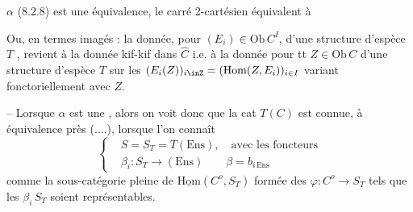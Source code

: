  $\alpha$ (8.2.8) est  une équivalence,  le carré 2-cartésien
 équivalent à

\margin{$\underset{\rightarrow}{\lambda}=\varnothing$}
Ou, en termes imagés : la donnée, pour $(E_i)\in\mathrm{Ob}\,C^I$, d'une
structure d'espèce $T$ , revient à la donnée 
kif-kif dans $\widehat C$ i.e. à la donnée pour tt $Z\in\mathrm{Ob}\,C$ d'une
structure d'espèce $T$ sur les 
$(E_i(Z))_{i\inZ}=(\mathrm{Hom}(Z,E_i))_{i\in I}$
variant fonctoriellement avec $Z$.

-- Lorsque $\alpha$ est une , alors on voit donc que la cat
 $T(C)$ est connue, à équivalence près (....), lorsque
l'on connaît
\[
\left\{\begin{aligned}
&S=S_T=T(\mathrm{Ens}),\quad\text{avec les foncteurs}\\
&\beta_i:S_T\longrightarrow(\mathrm{Ens})\qquad\beta=b_{i\,\mathrm{Ens}}
\end{aligned}\right.\tag*{(8.2.11)}
\]
comme la sous-catégorie pleine de $\underline{\mathrm{Hom}}(C^o,S_T)$ formée des
$\varphi:C^o\longrightarrow S_T$ tels que les $\beta_i\,S_T$ soient représentables.

